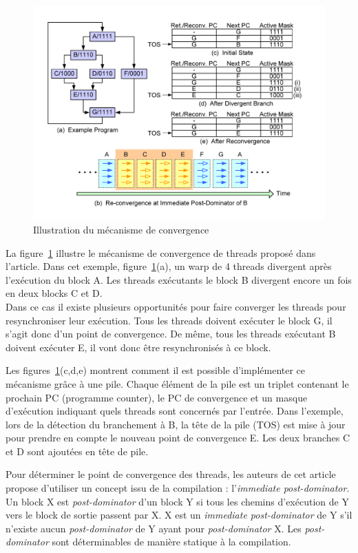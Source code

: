 \documentclass[11pt]{article}
\begin{document}
\begin{figure}[h]
   \caption{\label{BRANCHE} Illustration du mécanisme de convergence}
   \includegraphics[scale=.45]{branch-re}
\end{figure}

La figure~\ref{BRANCHE} illustre le mécanisme de convergence de threads proposé dans l'article. Dans cet exemple, figure~\ref{BRANCHE}(a), un warp de 4 threads divergent après l'exécution du block A. Les threads exécutants le block B divergent encore un fois en deux blocks C et D.
\\Dans ce cas il existe plusieurs opportunités pour faire converger les threads pour resynchroniser leur exécution.
Tous les threads doivent exécuter le block G, il s'agit donc d'un point de convergence.
De même, tous les threads exécutant B doivent exécuter E, il vont donc être resynchronisés à ce block.

Les figures~\ref{BRANCHE}(c,d,e) montrent comment il est possible d'implémenter ce mécanisme grâce à une pile. Chaque élément de la pile est un triplet contenant le prochain PC (programme counter), le PC de convergence et un masque d'exécution indiquant quels threads sont concernés par l'entrée.
Dans l'exemple, lors de la détection du branchement à B, la tête de la pile (TOS) est mise à jour pour prendre en compte le nouveau point de convergence E. Les deux branches C et D sont ajoutées en tête de pile.


Pour déterminer le point de convergence des threads, les auteurs de cet article propose d'utiliser un concept issu de la compilation : l'\emph{immediate post-dominator}. Un block X est \emph{post-dominator} d'un block Y si tous les chemins d'exécution de Y vers le block de sortie passent par X. X est un \emph{immediate post-dominator} de Y s'il n'existe aucun \emph{post-dominator} de Y ayant pour \emph{post-dominator} X.
Les \emph{post-dominator} sont déterminables de manière statique à la compilation.
\end{document}

